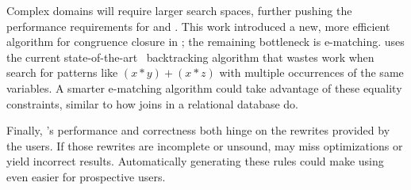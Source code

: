 Complex domains will require larger search spaces,
 further pushing the performance requirements for \egraphs and \eqsat.
This work introduced a new, more efficient
 algorithm for congruence closure in \egraphs;
 the remaining bottleneck is
 e-matching.
\egg uses the current state-of-the-art~\cite{ematching}
 backtracking algorithm that wastes work when
 search for patterns like $(x * y) + (x * z)$ with multiple
 occurrences of the same variables.
A smarter e-matching algorithm could
 take advantage of these equality constraints,
 similar to how joins in a relational database do.

Finally, \eqsat's performance and correctness
 both hinge on the rewrites provided by the users.
If those rewrites are incomplete or unsound,
 \eqsat may miss optimizations or yield incorrect results.
Automatically generating these rules could make using \eqsat even
 easier for prospective users.

